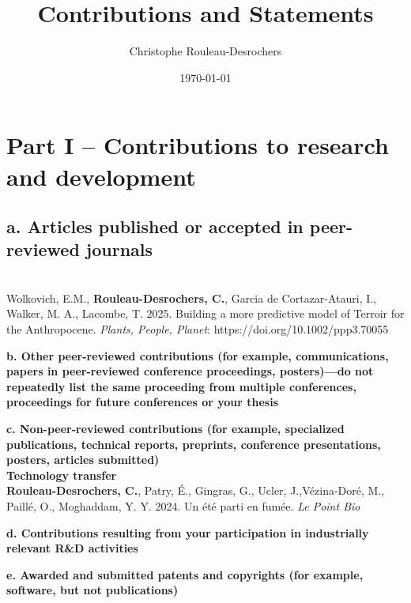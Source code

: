 \documentclass{article}
\title{Contributions and Statements}
\date{\today}
\author{Christophe Rouleau-Desrochers}
\begin{document}

\maketitle

\section*{Part I – Contributions to research and development}
\par
\subsection*{a. Articles published or accepted in peer-reviewed journals} \\
Wolkovich, E.M., \textbf{Rouleau-Desrochers, C.}, Garcia de Cortazar-Atauri, I., Walker, M. A., Lacombe,
T. 2025. Building a more predictive model of Terroir for the Anthropocene. \textit{Plants, People, Planet}: https://doi.org/10.1002/ppp3.70055 \\
\par
\textbf{b. Other peer-reviewed contributions (for example, communications, papers in peer-reviewed conference proceedings, posters)—do not repeatedly list the same proceeding from multiple conferences, proceedings for future conferences or your thesis} \\
\par
\textbf{c. Non-peer-reviewed contributions (for example, specialized publications, technical reports, preprints, conference presentations, posters, articles submitted) \\
Technology transfer} \\ 
\textbf{Rouleau-Desrochers, C.}, Patry, É., Gingras, G., Ucler, J.,Vézina-Doré, M., Paillé, O., Moghaddam, Y. Y. 2024. Un été parti en fumée. \textit{Le Point Bio}
\par
\textbf{d. Contributions resulting from your participation in industrially relevant R\&D activities} \\ 
\par
\textbf{e. Awarded and submitted patents and copyrights (for example, software, but not publications)}
\end{document}
